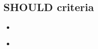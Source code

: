 \documentclass{beamer}
\begin{document}
\subsection{SHOULD criteria}

\begin{frame}{}

  \begin{itemize}
    \item
  \end{itemize}
\end{frame}

\begin{frame}{}
  \begin{itemize}
    \item
  \end{itemize}
\end{frame}
\end{document}
